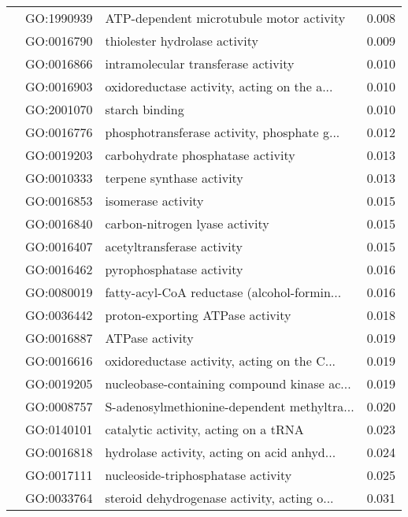 \begin{longtable}{lllr}
   & GO:1990939 &     ATP-dependent microtubule motor activity &         0.008 \\
   & GO:0016790 &                thiolester hydrolase activity &         0.009 \\
   & GO:0016866 &          intramolecular transferase activity &         0.010 \\
   & GO:0016903 &  oxidoreductase activity, acting on the a... &         0.010 \\
   & GO:2001070 &                               starch binding &         0.010 \\
   & GO:0016776 &  phosphotransferase activity, phosphate g... &         0.012 \\
   & GO:0019203 &            carbohydrate phosphatase activity &         0.013 \\
   & GO:0010333 &                    terpene synthase activity &         0.013 \\
   & GO:0016853 &                           isomerase activity &         0.015 \\
   & GO:0016840 &               carbon-nitrogen lyase activity &         0.015 \\
   & GO:0016407 &                   acetyltransferase activity &         0.015 \\
   & GO:0016462 &                     pyrophosphatase activity &         0.016 \\
   & GO:0080019 &  fatty-acyl-CoA reductase (alcohol-formin... &         0.016 \\
   & GO:0036442 &             proton-exporting ATPase activity &         0.018 \\
   & GO:0016887 &                              ATPase activity &         0.019 \\
   & GO:0016616 &  oxidoreductase activity, acting on the C... &         0.019 \\
   & GO:0019205 &  nucleobase-containing compound kinase ac... &         0.019 \\
   & GO:0008757 &  S-adenosylmethionine-dependent methyltra... &         0.020 \\
   & GO:0140101 &         catalytic activity, acting on a tRNA &         0.023 \\
   & GO:0016818 &  hydrolase activity, acting on acid anhyd... &         0.024 \\
   & GO:0017111 &           nucleoside-triphosphatase activity &         0.025 \\
   & GO:0033764 &  steroid dehydrogenase activity, acting o... &         0.031 \\

\end{longtable}

